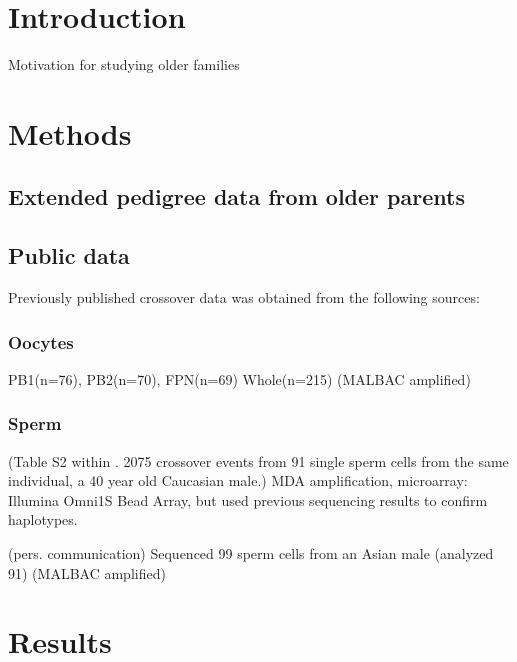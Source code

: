 

\section{Introduction}

Motivation for studying older families

\section{Methods}

\subsection{Extended pedigree data from older parents}

\subsection{Public data}
Previously published crossover data was obtained from the following sources:

\subsubsection{Oocytes}
\cite{Hou2013}
PB1(n=76), PB2(n=70), FPN(n=69)
Whole(n=215)
(MALBAC amplified)

\subsubsection{Sperm}
\cite{Wang2012} (Table S2 within \citet{Wang2012}. 2075 crossover events from 91 single sperm cells from the same individual, a 40 year old Caucasian male.)
MDA amplification, microarray: Illumina Omni1S Bead Array, but used previous sequencing results to confirm haplotypes.

\cite{Lu2012b} (pers. communication)
Sequenced 99 sperm cells from an Asian male (analyzed 91)
(MALBAC amplified)


\section{Results}
